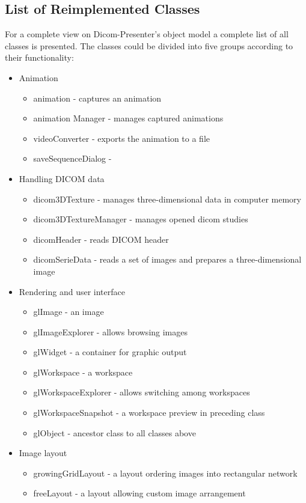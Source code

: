 \subsection{List of Reimplemented Classes}
For a complete view on Dicom-Presenter's object model a complete list of all classes is presented. The classes could be divided into five groups according to their functionality:
\begin{itemize}
\item Animation
	\begin{itemize}
	\item animation	- captures an animation
	\item animation Manager	- manages captured animations
	\item videoConverter - exports the animation to a file
	\item saveSequenceDialog  - 
	\end{itemize}
\item Handling DICOM data
	\begin{itemize}
	\item dicom3DTexture - manages three-dimensional data in computer memory
	\item dicom3DTextureManager - manages opened dicom studies
	\item dicomHeader - reads DICOM header
	\item dicomSerieData - reads a set of images and prepares a three-dimensional image 
	\end{itemize}
\item Rendering and user interface
	\begin{itemize}
	\item glImage - an image
	\item glImageExplorer - allows browsing images
	\item glWidget - a container for graphic output
	\item glWorkspace - a workspace
	\item glWorkspaceExplorer - allows switching among workspaces
	\item glWorkspaceSnapshot - a workspace preview in preceding class
	\item glObject - ancestor class to all classes above 
	\end{itemize}
\item Image layout
	\begin{itemize}
	\item growingGridLayout - a layout ordering images into rectangular network
	\item freeLayout - a layout allowing custom image arrangement

\end{itemize}
\end{itemize}
